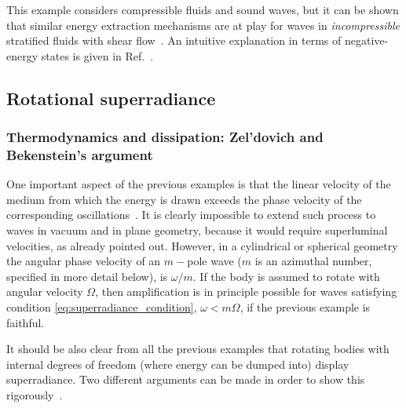 \documentclass[11pt]{article}
\numberwithin{equation}{section} %
\begin{document}
This example considers compressible fluids and sound waves, but it can be shown that similar energy extraction mechanisms
are at play for waves in {\it incompressible} stratified fluids with shear flow~\cite{Booker:1967,Jones:1968,McKenzie:1972}.
An intuitive explanation in terms of negative-energy states is given in Ref.~\cite{McKenzie:1972}.
\subsection{Rotational superradiance\label{sec:rotSR}}

\subsubsection{Thermodynamics and dissipation: Zel'dovich and Bekenstein's argument\label{sec:Zeldovich}}
One important aspect of the previous examples is that the linear velocity 
of the medium from which the energy is drawn exceeds the phase velocity of the corresponding
oscillations~\cite{zeldovich2}. It is clearly impossible to extend such process to waves in vacuum and in plane geometry, because it would require
superluminal velocities, as already pointed out. However, in a cylindrical or spherical geometry
the angular phase velocity of an $m-$pole wave ($m$ is an azimuthal number, specified in more detail below),
is $\omega/m$. If the body is assumed to rotate with angular velocity $\Omega$, then amplification is in principle possible for waves satisfying condition \eqref{eq:superradiance_condition}, $\omega<m\Omega$, if the previous example is faithful.


It should be also clear from all the previous examples that rotating bodies with internal degrees of freedom
(where energy can be dumped into) display superradiance.
Two different arguments can be made in order to show this rigorously~\cite{zeldovich2,Bekenstein:1998nt}.
\end{document}

